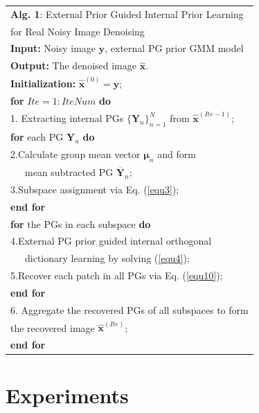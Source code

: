 \documentclass[10pt,twocolumn,letterpaper]{article}
\begin{document}
\begin{table}\label{alg1}
\begin{tabular}{l}
\hline
\textbf{Alg. 1}: External Prior Guided Internal Prior Learning
\\
\quad \quad \quad for Real Noisy Image Denoising
\\
\hline
\textbf{Input:} Noisy image $\mathbf{y}$, external PG prior GMM model
\\
\textbf{Output:} The denoised image $\hat{\mathbf{x}}$.
\\
\textbf{Initialization:} $\hat{\mathbf{x}}^{(0)}=\mathbf{y}$;
\\
\textbf{for} $Ite = 1:IteNum$ \textbf{do}
\\
1. Extracting internal PGs $\{\mathbf{Y}_{n}\}_{n=1}^{N}$ from $\hat{\mathbf{x}}^{(Ite-1)}$;
\\
\quad\textbf{for} each PG $\mathbf{Y}_{n}$ \textbf{do}
\\
2.\quad Calculate group mean vector $\bm{\mu}_{n}$ and form 
\\
\quad \ \ \ mean subtracted PG $\mathbf{\overline{Y}}_{n}$;
\\
3.\quad Subspace assignment via Eq. (\ref{equ3});
\\
\quad\textbf{end for}
\\
\quad\textbf{for} the PGs in each subspace \textbf{do}
\\
4.\quad External PG prior guided internal orthogonal
\\
\quad \ \ \ dictionary learning by solving (\ref{equ4});
\\
5.\quad Recover each patch in all PGs via Eq. (\ref{equ10});
\\
\quad\textbf{end for}
\\
6. Aggregate the recovered PGs of all subspaces to form
\\
\quad the recovered image $\hat{\mathbf{x}}^{(Ite)}$;
\\
\textbf{end for}
\\
\hline
\end{tabular}
\end{table}



\section{Experiments}\vspace{-1mm}
\end{document}
